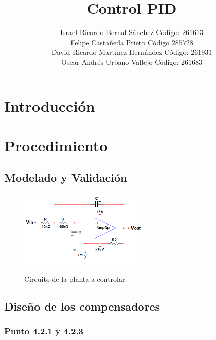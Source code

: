 \documentclass[twocolumn]{IEEEtran}
\begin{document}
\title{Control PID}
\author{Israel Ricardo Bernal Sánchez Código: $261613$\\
	Felipe Castañeda Prieto Código $285728$\\
	David Ricardo Martínez Hernández Código: $261931$\\
	Oscar Andrés Urbano Vallejo Código: $261683$}
\maketitle
{}

\begin{abstract}

\end{abstract}
\begin{keywords}
 
\end{keywords}

\section{Introducción}
\noindent


\section{Procedimiento}
\noindent
\subsection{Modelado y Validación}
\noindent
\begin{figure}[H]
	\centering
		\includegraphics[scale=1.2]{montaje1.png}
	\caption{Circuito de la planta a controlar.}
	\label{fig1}
\end{figure}

\subsection{Diseño de los compensadores}

\subsubsection{Punto 4.2.1 y 4.2.3}
\end{document}

